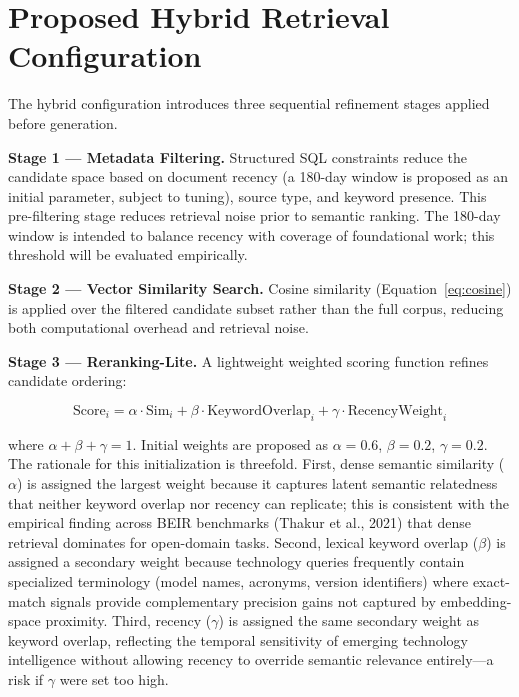 \documentclass[12pt,a4paper]{report}
\begin{document}
\section{Proposed Hybrid Retrieval Configuration}
\label{sec:hybrid}

The hybrid configuration introduces three sequential refinement stages applied before generation.

\textbf{Stage 1 — Metadata Filtering.} Structured SQL constraints reduce the candidate space based on document recency (a 180-day window is proposed as an initial parameter, subject to tuning), source type, and keyword presence. This pre-filtering stage reduces retrieval noise prior to semantic ranking. The 180-day window is intended to balance recency with coverage of foundational work; this threshold will be evaluated empirically.

\textbf{Stage 2 — Vector Similarity Search.} Cosine similarity (Equation~\ref{eq:cosine}) is applied over the filtered candidate subset rather than the full corpus, reducing both computational overhead and retrieval noise.

\textbf{Stage 3 — Reranking-Lite.} A lightweight weighted scoring function refines candidate ordering:

\begin{equation}
  \text{Score}_i = \alpha \cdot \text{Sim}_i + \beta \cdot \text{KeywordOverlap}_i + \gamma \cdot \text{RecencyWeight}_i
  \label{eq:reranking}
\end{equation}

where $\alpha + \beta + \gamma = 1$. Initial weights are proposed as $\alpha = 0.6$, $\beta = 0.2$, $\gamma = 0.2$. The rationale for this initialization is threefold. First, dense semantic similarity ($\alpha$) is assigned the largest weight because it captures latent semantic relatedness that neither keyword overlap nor recency can replicate; this is consistent with the empirical finding across BEIR benchmarks (Thakur et al., 2021) that dense retrieval dominates for open-domain tasks. Second, lexical keyword overlap ($\beta$) is assigned a secondary weight because technology queries frequently contain specialized terminology (model names, acronyms, version identifiers) where exact-match signals provide complementary precision gains not captured by embedding-space proximity. Third, recency ($\gamma$) is assigned the same secondary weight as keyword overlap, reflecting the temporal sensitivity of emerging technology intelligence without allowing recency to override semantic relevance entirely—a risk if $\gamma$ were set too high.
\end{document}
